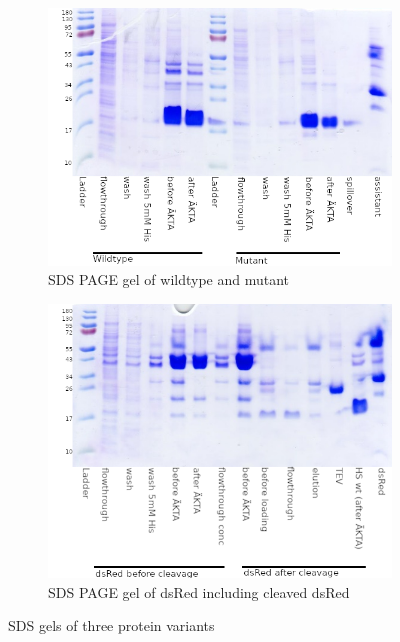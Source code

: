 \begin{figure}[h!]
    \centering
    \begin{subfigure}{0.7\textwidth}
        \includegraphics[width=\textwidth]{img/sds_wt_mut}
        \caption{SDS PAGE gel of wildtype and mutant}
        \label{fig:sds_wt_mut}
    \end{subfigure}

    \begin{subfigure}{0.7\textwidth}
        \includegraphics[width=\textwidth]{img/sds_dsred_tev_cleavage.png}
        \caption{SDS PAGE gel of dsRed including cleaved dsRed}
        \label{fig:sds_dsred_cleaved}
    \end{subfigure}
    \caption{SDS gels of three protein variants}
    \label{fig:sds}
\end{figure}

